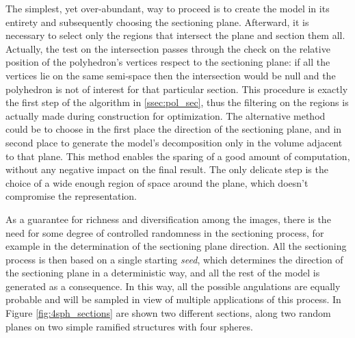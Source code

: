 \begin{figure}[ht]
            \label{fig:first_sect}
        \end{figure}

    The simplest, yet over-abundant, way to proceed is to create the model in its entirety and subsequently choosing the sectioning plane. Afterward, it is necessary to select only the regions that intersect the plane and section them all. Actually, the test on the intersection passes through the check on the relative position of the polyhedron's vertices respect to the sectioning plane: if all the vertices lie on the same semi-space then the intersection would be null and the polyhedron is not of interest for that particular section. This procedure is exactly the first step of the algorithm in \ref{ssec:pol_sec}, thus the filtering on the regions is actually made during construction for optimization. The alternative method could be to choose in the first place the direction of the sectioning plane, and in second place to generate the model's decomposition only in the volume adjacent to that plane. This method enables the sparing of a good amount of computation, without any negative impact on the final result. The only delicate step is the choice of a wide enough region of space around the plane, which doesn't compromise the representation.

    As a guarantee for richness and diversification among the images, there is the need for some degree of controlled randomness in the sectioning process, for example in the determination of the sectioning plane direction. All the sectioning process is then based on a single starting \textit{seed}, which determines the direction of the sectioning plane in a deterministic way, and all the rest of the model is generated as a consequence. In this way, all the possible angulations are equally probable and will be sampled in view of multiple applications of this process. In Figure \ref{fig:4sph_sections} are shown two different sections, along two random planes on two simple ramified structures with four spheres.

